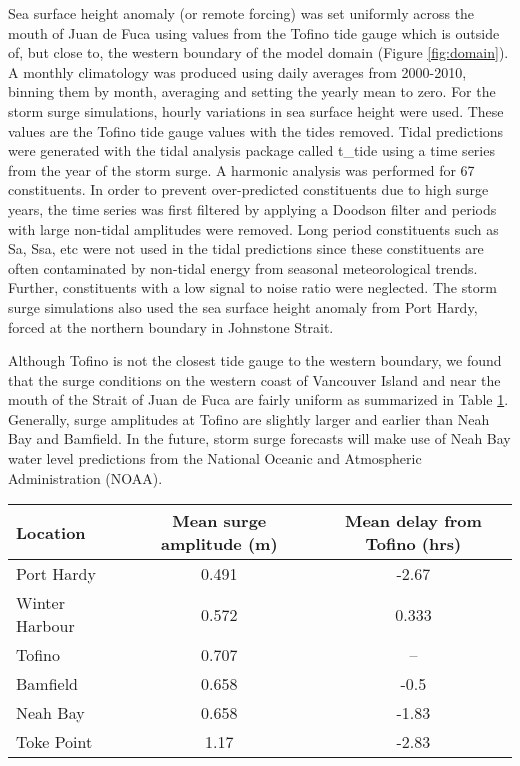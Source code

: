 \documentclass[letterpaper]{tATO2e}
\begin{document}
Sea surface height anomaly (or remote forcing) was set uniformly across the mouth of Juan de Fuca using values from the Tofino tide gauge \citep{DFOObservations} which is outside of, but close to, the western boundary of the model domain (Figure \ref{fig:domain}).  A monthly climatology was produced using daily averages from 2000-2010, binning them by month, averaging and setting the yearly mean to zero.  For the storm surge simulations, hourly variations in sea surface height were used.  These values are the Tofino tide gauge values with the tides removed. {\color{red}Tidal predictions were generated with the tidal analysis package called t\_tide \citep{pawlowicz2002classical} using a time series from the year of the storm surge. A harmonic analysis was performed for 67 constituents. In order to prevent over-predicted constituents due to high surge years, the time series was first filtered by applying a Doodson filter \citep{parker2007NOAA} and periods with large non-tidal amplitudes were removed. Long period constituents such as Sa, Ssa, etc were not used in the tidal predictions since these constituents are often contaminated by non-tidal energy from seasonal meteorological trends. Further, constituents with a low signal to noise ratio were neglected. } The storm surge simulations also used the sea surface height anomaly from Port Hardy, forced at the northern boundary in Johnstone Strait. 

{\color{red} Although Tofino is not the closest tide gauge to the western boundary, we found that the surge conditions on the western coast of Vancouver Island and near the mouth of the Strait of Juan de Fuca are fairly uniform as summarized in Table \ref{tab:pacificsurge}. Generally, surge amplitudes at Tofino are slightly larger and earlier than Neah Bay and Bamfield. In the future, storm surge forecasts will make use of Neah Bay water level predictions from the National Oceanic and Atmospheric Administration (NOAA).}

\begin{table}[h]
\centering 
{} 
{\begin{tabular}{|l |c | c|}
\hline 
Location & Mean surge amplitude (m) & Mean delay from Tofino (hrs) \\
\hline
Port Hardy & 0.491 & -2.67\\
Winter Harbour & 0.572 & 0.333 \\
Tofino  & 0.707 & -- \\
Bamfield & 0.658 & -0.5 \\
Neah Bay & 0.658 & -1.83 \\
Toke Point & 1.17 & -2.83 \\
\hline
\end{tabular}}
\label{tab:pacificsurge}
\end{table}
\end{document}
